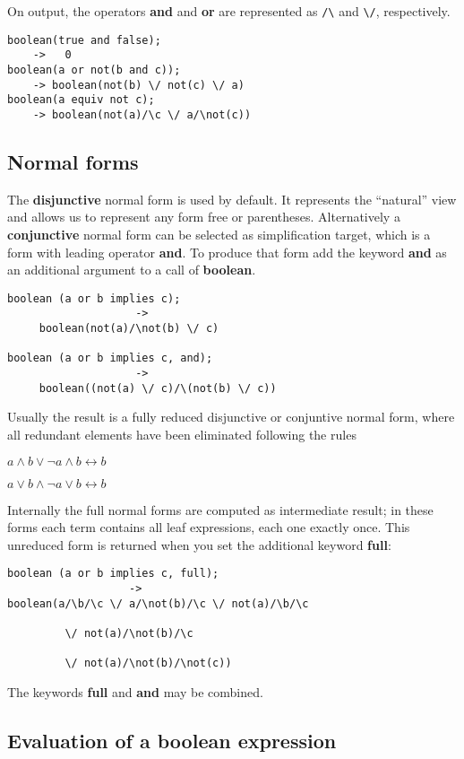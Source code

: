 On output, the
operators \textbf{and} and \textbf{or} are represented as
\texttt{/\textbackslash} and \texttt{\textbackslash /}, respectively.
\begin{verbatim}
boolean(true and false);
    ->   0
boolean(a or not(b and c));
    -> boolean(not(b) \/ not(c) \/ a)
boolean(a equiv not c);
    -> boolean(not(a)/\c \/ a/\not(c))
\end{verbatim}

\subsection{Normal forms}

The \textbf{disjunctive} normal form is used by default. It
represents the ``natural'' view and allows us to represent
any form free or parentheses.
Alternatively a \textbf{conjunctive} normal form can be
selected as simplification target, which is a form with
leading operator \textbf{and}. To produce that form add the keyword  \textbf{and}
as an additional argument to a call of \textbf{boolean}.
\begin{verbatim}
boolean (a or b implies c); 
                    -> 
     boolean(not(a)/\not(b) \/ c)

boolean (a or b implies c, and); 
                    ->
     boolean((not(a) \/ c)/\(not(b) \/ c))
\end{verbatim}

Usually the result is a fully reduced disjunctive or conjuntive normal
form, where all redundant elements have been eliminated following the
rules

$ a \wedge b \vee \neg a \wedge b \longleftrightarrow b$

$ a \vee b \wedge \neg a \vee b \longleftrightarrow b$
 

Internally the full normal forms are computed
as intermediate result; in these forms each term contains
all leaf expressions, each one exactly once. This unreduced form is returned 
when you set the additional keyword \textbf{full}:
\begin{verbatim}
boolean (a or b implies c, full);
                   ->
boolean(a/\b/\c \/ a/\not(b)/\c \/ not(a)/\b/\c

         \/ not(a)/\not(b)/\c

         \/ not(a)/\not(b)/\not(c))
\end{verbatim}

The keywords \textbf{full} and \textbf{and} may be combined.

\subsection{Evaluation of a boolean expression}

